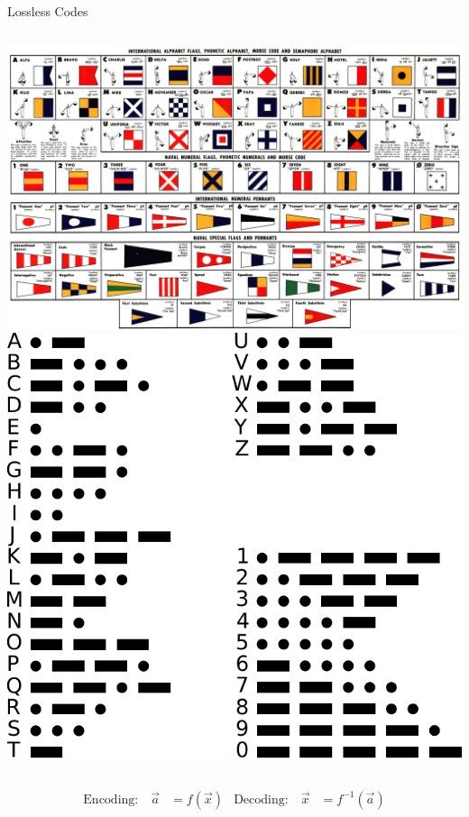 \documentclass[handout,aspectratio=169]{beamer}
\begin{document}
\begin{frame}{Lossless Codes}
	\vspace{0.5cm}
	\begin{columns}
		\includegraphics[width=\textwidth]{media/flag_alphabet_1956_small.jpg}
		\includegraphics[width=\textwidth]{media/international_morse_code.pdf}
	\end{columns}
	\vspace{0.25cm}
	\begin{align*}
		\text{Encoding:} \quad \vec a &= f(\vec x) & \text{Decoding:} \quad \vec x &= f^{-1}(\vec a)
	\end{align*}
\end{frame}
\end{document}
